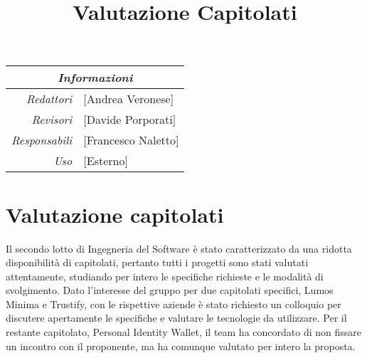 \documentclass[12pt]{article}
\begin{document}
\graphicspath{ {../../templates/img/} }


\title{Valutazione Capitolati}

\firstPage
\maketitle


\begin{center}
    \begin{tabular}{r | l}
		\multicolumn{2}{c}{\textit{Informazioni}}\\
		\hline
		
			\textit{Redattori} &
			[Andrea Veronese]\makecell{}\\
		
			\textit{Revisori} &
			[Davide Porporati]\makecell{}\\
			\textit{Responsabili} &
			[Francesco Naletto]\makecell{}\\
		      \textit{Uso} & 
                [Esterno]\makecell{}\\
\end{tabular}
\end{center}


\tableofcontents
\printindex 
\section{Valutazione capitolati}
Il secondo lotto di Ingegneria del Software è stato caratterizzato da una ridotta disponibilità di capitolati, pertanto tutti i progetti sono stati valutati attentamente, studiando per intero le specifiche richieste e le modalità di svolgimento.
Dato l'interesse del gruppo per due capitolati specifici, Lumos Minima e Trustify, con le rispettive aziende è stato richiesto un colloquio per discutere apertamente le specifiche e valutare le tecnologie da utilizzare.
Per il restante capitolato, Personal Identity Wallet, il team ha concordato di non fissare un incontro con il proponente, ma ha comunque valutato per intero la proposta.
\end{document}
